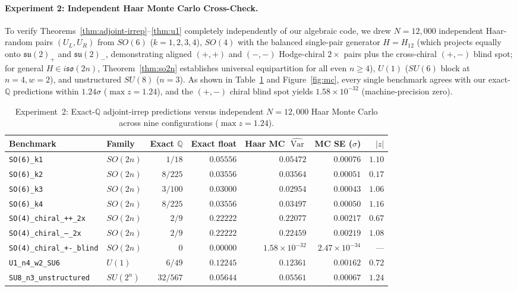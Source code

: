 \documentclass[11pt,a4paper]{article}
\theoremstyle{definition}
\theoremstyle{remark}
\newcommand{\QQ}{\mathbb{Q}}
\newcommand{\Var}{\operatorname{Var}}
\newcommand{\so}{\mathfrak{so}}
\newcommand{\su}{\mathfrak{su}}
\begin{document}
\paragraph{Experiment 2: Independent Haar Monte Carlo Cross-Check.}
To verify Theorems~\ref{thm:adjoint-irrep}--\ref{thm:u1} completely independently of our algebraic code, we drew $N = 12{,}000$ independent Haar-random pairs $(U_L, U_R)$ from $SO(6)$ ($k = 1, 2, 3, 4$), $SO(4)$ with the balanced single-pair generator $H = H_{12}$ (which projects equally onto $\su(2)_+$ and $\su(2)_-$, demonstrating aligned $(+,+)$ and $(-,-)$ Hodge-chiral $2\times$ pairs plus the cross-chiral $(+,-)$ blind spot; for general $H \in i\so(2n)$, Theorem~\ref{thm:so2n} establishes universal equipartition for all even $n \ge 4$), $U(1)$ ($SU(6)$ block at $n=4, w=2$), and unstructured $SU(8)$ ($n=3$). As shown in Table~\ref{tab:mc} and Figure~\ref{fig:mc}, every single benchmark agrees with our exact-$\QQ$ predictions within $1.24\sigma$ ($\max z = 1.24$), and the $(+,-)$ chiral blind spot yields $1.58\times 10^{-32}$ (machine-precision zero).

\begin{table}[t]
\centering
\caption{Experiment~2: Exact-$\QQ$ adjoint-irrep predictions versus independent $N=12{,}000$ Haar Monte Carlo across nine configurations ($\max z = 1.24$).}
\label{tab:mc}
\footnotesize
\setlength{\tabcolsep}{6pt}
\begin{tabular}{@{}llrrrrr@{}}
\toprule
Benchmark & Family & Exact $\QQ$ & Exact float & Haar MC $\widehat{\Var}$ & MC SE ($\sigma$) & $|z|$ \\
\midrule
\texttt{SO(6)\_k1} & $SO(2n)$ & $1/18$ & $0.05556$ & $0.05472$ & $0.00076$ & $1.10$ \\
\texttt{SO(6)\_k2} & $SO(2n)$ & $8/225$ & $0.03556$ & $0.03564$ & $0.00051$ & $0.17$ \\
\texttt{SO(6)\_k3} & $SO(2n)$ & $3/100$ & $0.03000$ & $0.02954$ & $0.00043$ & $1.06$ \\
\texttt{SO(6)\_k4} & $SO(2n)$ & $8/225$ & $0.03556$ & $0.03497$ & $0.00050$ & $1.16$ \\
\texttt{SO(4)\_chiral\_++\_2x} & $SO(2n)$ & $2/9$ & $0.22222$ & $0.22077$ & $0.00217$ & $0.67$ \\
\texttt{SO(4)\_chiral\_--\_2x} & $SO(2n)$ & $2/9$ & $0.22222$ & $0.22459$ & $0.00219$ & $1.08$ \\
\texttt{SO(4)\_chiral\_+-\_blind} & $SO(2n)$ & $0$ & $0.00000$ & $1.58\times 10^{-32}$ & $2.47\times 10^{-34}$ & --- \\
\texttt{U1\_n4\_w2\_SU6} & $U(1)$ & $6/49$ & $0.12245$ & $0.12361$ & $0.00162$ & $0.72$ \\
\texttt{SU8\_n3\_unstructured} & $SU(2^n)$ & $32/567$ & $0.05644$ & $0.05561$ & $0.00067$ & $1.24$ \\
\bottomrule
\end{tabular}
\end{table}
\end{document}

